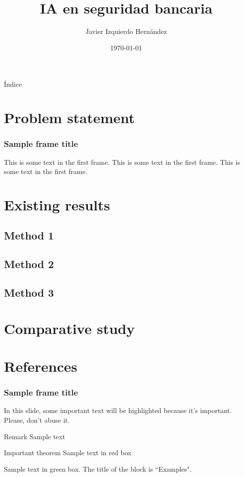\documentclass{beamer}
\title[Impacto IA en finanzas]{IA en seguridad bancaria}
\author{Javier Izquierdo Hernández}
\institute{Universidad Rey Juan Carlos}
\date{\today}
\begin{document}
	
	\frame{\titlepage}
	
	\begin{frame}{Índice}
		\tableofcontents
	\end{frame}
	
	\section{Problem statement}
	\begin{frame}
		\frametitle{Sample frame title}
		This is some text in the first frame. This is some text in the first frame. This is some text in the first frame.
	\end{frame}
	
	\section{Existing results}
	\subsection{Method 1}
	\subsection{Method 2}
	\subsection{Method 3}
	\section{Comparative study}
	\section*{References}
	

	
	\begin{frame}
		\frametitle{Sample frame title}
		
		In this slide, some important text will be
		\alert{highlighted} because it's important.
		Please, don't abuse it.
		
		\begin{block}{Remark}
			Sample text
		\end{block}
		
		\begin{alertblock}{Important theorem}
			Sample text in red box
		\end{alertblock}
		
		\begin{examples}
			Sample text in green box. The title of the block is ``Examples".
		\end{examples}
	\end{frame}
	
\end{document}
